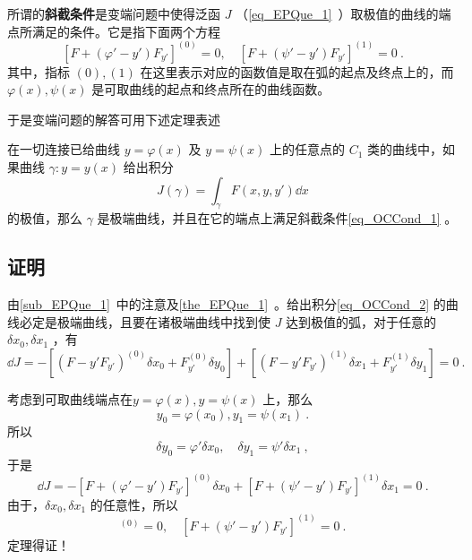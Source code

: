 
所谓的\textbf{斜截条件}是变端问题中使得泛函 $J$ （\autoref{eq_EPQue_1}~）取极值的曲线的端点所满足的条件。它是指下面两个方程
\begin{equation}\label{eq_OCCond_1}
[F+(\varphi'-y')F_{y'}]^{(0)}=0,\quad [F+(\psi'-y')F_{y'}]^{(1)}=0~.
\end{equation}
其中，指标 ${(0)},{(1)}$ 在这里表示对应的函数值是取在弧的起点及终点上的，而 $\varphi(x),\psi(x)$ 是可取曲线的起点和终点所在的曲线函数。

于是变端问题的解答可用下述定理表述
\begin{theorem}{}
在一切连接已给曲线 $y=\varphi(x)$ 及 $y=\psi(x)$ 上的任意点的 $C_1$ 类的曲线中，如果曲线 $\gamma:y=y(x)$ 给出积分
\begin{equation}\label{eq_OCCond_2}
J(\gamma)=\int_{\gamma}F(x,y,y')\dd x
\end{equation}
的极值，那么 $\gamma$ 是极端曲线，并且在它的端点上满足斜截条件\autoref{eq_OCCond_1} 。
\end{theorem}
\subsection{证明}
由\autoref{sub_EPQue_1}~中的注意及\autoref{the_EPQue_1}~。给出积分\autoref{eq_OCCond_2} 的曲线必定是极端曲线，且要在诸极端曲线中找到使 $J$ 达到极值的弧，对于任意的 $\delta x_0,\delta x_1$ ，有
\begin{equation}
\dd J=-[(F-y'F_{y'})^{(0)}\delta {x_0}+ F_{y'}^{(0)}\delta y_0]+[(F-y'F_{y'})^{(1)}\delta {x_1}+F_{y'}^{(1)}\delta y_1]=0~.
\end{equation}

 考虑到可取曲线端点在$y=\varphi(x),y=\psi(x)$ 上，那么
 \begin{equation}
 y_0=\varphi(x_0),y_1=\psi(x_1)~.
 \end{equation}
 所以 
 \begin{equation}
 \delta y_0=\varphi'\delta x_0,\quad \delta y_1=\psi'\delta x_1~,
 \end{equation}
 于是
 \begin{equation}
\dd J=-[F+(\varphi'-y')F_{y'}]^{(0)}\delta {x_0}+[F+(\psi'-y')F_{y'}]^{(1)}\delta {x_1}=0~.
\end{equation}
由于，$\delta x_0,\delta x_1$ 的任意性，所以
\begin{equation}
[F+(\varphi'-y')F_{y'}]^{(0)}=0,\quad [F+(\psi'-y')F_{y'}]^{(1)}=0~.
\end{equation}
定理得证！